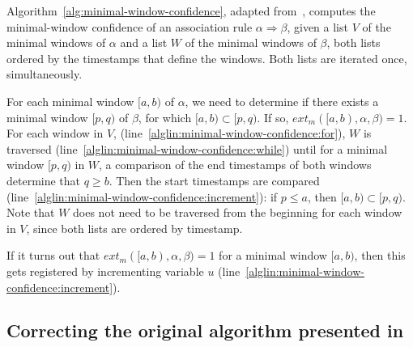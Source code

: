 Algorithm~\ref{alg:minimal-window-confidence}, adapted from~\citep{cule2014marbles}, computes the minimal-window confidence of an association rule $ \alpha \Rightarrow \beta $, given a list $ V $ of the minimal windows of $ \alpha $ and a list $ W $ of the minimal windows of $ \beta $, both lists ordered by the timestamps that define the windows. Both lists are iterated once, simultaneously.

For each minimal window $ [a, b) $ of $ \alpha $, we need to determine if there exists a minimal window $ [p, q) $ of $ \beta $, for which $ [a, b) \subset [p, q) $. If so, $ ext_m([a, b), \alpha, \beta) = 1 $. For each window in $ V $, (line~\ref{alglin:minimal-window-confidence:for}), $ W $ is traversed (line~\ref{alglin:minimal-window-confidence:while}) until for a minimal window $ [p, q) $ in $ W $, a comparison of the end timestamps of both windows determine that $ q \geq b $. Then the start timestamps are compared (line~\ref{alglin:minimal-window-confidence:increment}): if $ p \leq a $, then $ [a, b) \subset [p, q) $. Note that $ W $ does not need to be traversed from the beginning for each window in $ V $, since both lists are ordered by timestamp.

If it turns out that $ ext_m([a, b), \alpha, \beta) = 1 $ for a minimal window $ [a, b) $, then this gets registered by incrementing variable $ u $ (line~\ref{alglin:minimal-window-confidence:increment}).

\iffalse
\begin{figure}
\centering

\begin{tikzpicture}

\sequencetickmarks{15}{0}{0}

\foreach \x in {0,0.5,...,7}
    \draw [gray,ultra thin] (\x,2) -- (\x,-15pt);

\draw [very thick] (2.5,10pt) ++(0,-3pt) -- ++(0,3pt) -- ++(1.9,0) -- +(0,-3pt);
\windowthingy{(1,-5pt)}{5}
\windowthingy{(2,-10pt)}{6}

\end{tikzpicture}

\caption{Finding a minimal window of $ \beta $ that contains a given minimal window of $ \alpha $ (drawn above the sequence tick marks in bold).}
\label{fig:minimal-window-confidence}
\end{figure}
\fi

\subsection{Correcting the original algorithm presented in~\citep{cule2014marbles}}

